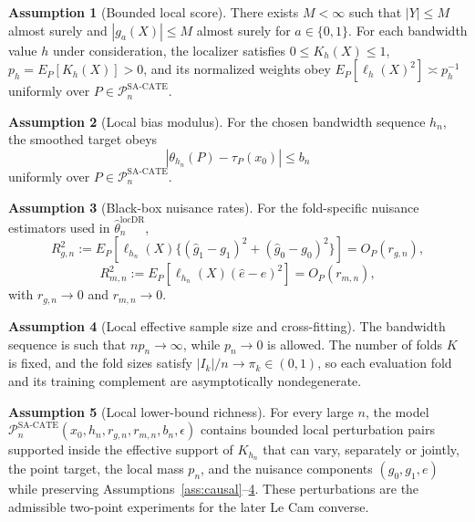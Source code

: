\documentclass[11pt]{article}
\theoremstyle{definition}
\newtheorem{assumption}{Assumption}
\theoremstyle{plain}
\theoremstyle{remark}
\begin{document}
\begin{assumption}[Bounded local score]\label{ass:bounded}
There exists $M<\infty$ such that $|Y|\le M$ almost surely and $|g_a(X)|\le M$ almost surely for
$a\in\{0,1\}$. For each bandwidth value $h$ under consideration, the localizer satisfies
$0\le K_h(X)\le 1$, $p_h=E_P[K_h(X)]>0$, and its normalized weights obey
$E_P[\ell_h(X)^2]\asymp p_h^{-1}$ uniformly over
$P\in\mathcal{P}_n^{\mathrm{SA\text{-}CATE}}$.
\end{assumption}

\begin{assumption}[Local bias modulus]\label{ass:bias}
For the chosen bandwidth sequence $h_n$, the smoothed target obeys
\[
  \left|\theta_{h_n}(P)-\tau_P(x_0)\right|\le b_n
\]
uniformly over $P\in\mathcal{P}_n^{\mathrm{SA\text{-}CATE}}$.
\end{assumption}

\begin{assumption}[Black-box nuisance rates]\label{ass:nuisance}
For the fold-specific nuisance estimators used in $\hat\theta_n^{\mathrm{locDR}}$,
\[
  R_{g,n}^2
  :=E_P\!\left[\ell_{h_n}(X)\{(\hat g_1-g_1)^2+(\hat g_0-g_0)^2\}\right]
  =O_P(r_{g,n}),
\]
\[
  R_{m,n}^2
  :=E_P\!\left[\ell_{h_n}(X)(\hat e-e)^2\right]
  =O_P(r_{m,n}),
\]
with $r_{g,n}\to0$ and $r_{m,n}\to0$.
\end{assumption}

\begin{assumption}[Local effective sample size and cross-fitting]\label{ass:effective}
The bandwidth sequence is such that $n p_n\to\infty$, while $p_n\to0$ is allowed. The number of
folds $K$ is fixed, and the fold sizes satisfy $|I_k|/n\to\pi_k\in(0,1)$, so each evaluation fold and
its training complement are asymptotically nondegenerate.
\end{assumption}

\begin{assumption}[Local lower-bound richness]\label{ass:local-rich}
For every large $n$, the model
$\mathcal{P}_n^{\mathrm{SA\text{-}CATE}}(x_0,h_n,r_{g,n},r_{m,n},b_n,\epsilon)$ contains bounded
local perturbation pairs supported inside the effective support of $K_{h_n}$ that can vary, separately
or jointly, the point target, the local mass $p_n$, and the nuisance components $(g_0,g_1,e)$ while
preserving Assumptions~\ref{ass:causal}--\ref{ass:effective}. These perturbations are the admissible
two-point experiments for the later Le Cam converse.
\end{assumption}
\end{document}
